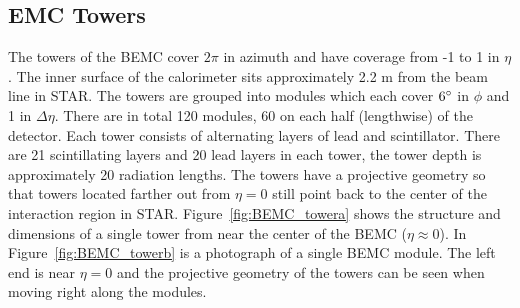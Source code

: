 \subsection{EMC Towers}

The towers of the BEMC cover $2\pi$ in azimuth and have coverage from -1 to 1 in $\eta$. The inner surface of the calorimeter sits approximately 2.2 m from the beam line in STAR. The towers are grouped into modules which each cover $6\degree$ in $\phi$ and 1 in $\Delta\eta$. There are in total 120 modules, 60 on each half (lengthwise) of the detector. Each tower consists of alternating layers of lead and scintillator. There are 21 scintillating layers and 20 lead layers in each tower, the tower depth is approximately 20 radiation lengths. The towers have a projective geometry so that towers located farther out from $\eta = 0$ still point back to the center of the interaction region in STAR. Figure~\ref{fig:BEMC_towera} shows the structure and dimensions of a single tower from near the center of the BEMC ($\eta \approx 0$). In Figure~\ref{fig:BEMC_towerb} is a photograph of a single BEMC module. The left end is near $\eta = 0$ and the projective geometry of the towers can be seen when moving right along the modules.


